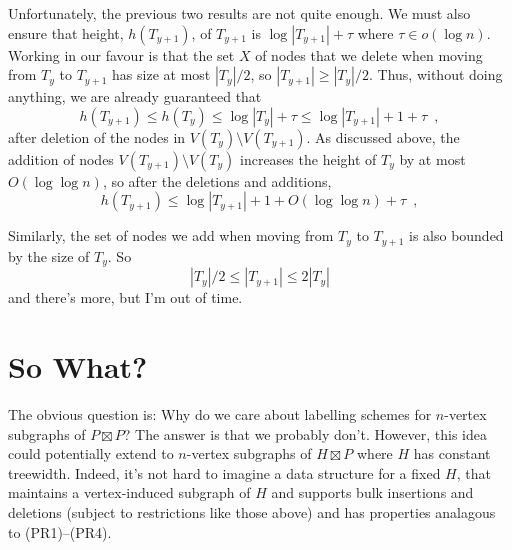\documentclass[kpfonts]{patmorin}
\begin{document}
Unfortunately, the previous two results are not quite enough.  We must also ensure that height, $h(T_{y+1})$, of $T_{y+1}$ is $\log |T_{y+1}| + \tau$ where $\tau\in o(\log n)$.  Working in our favour is that the set $X$ of nodes that we delete when moving from $T_y$ to $T_{y+1}$ has size at most $|T_y|/2$, so $|T_{y+1}|\ge |T_y|/2$. Thus, without doing anything, we are already guaranteed that 
\[  
  h(T_{y+1})\le h(T_y)\le \log|T_y|+\tau \le \log|T_{y+1}| + 1 + \tau \enspace ,
\]
after deletion of the nodes in $V(T_y)\setminus V(T_{y+1})$. As discussed above, the addition of nodes $V(T_{y+1})\setminus V(T_y)$ increases the height of $T_y$ by at most $O(\log\log n)$, so after the deletions and additions, 
\[  
  h(T_{y+1})\le \log|T_{y+1}| + 1 + O(\log\log n) + \tau \enspace ,
\]

Similarly, the set of nodes we add when moving from $T_y$ to $T_{y+1}$ is also bounded by the size of $T_y$.  So
\[ |T_y|/2\le |T_{y+1}| \le 2|T_y| \]
and there's more, but I'm out of time.


\section{So What?}

The obvious question is: Why do we care about labelling schemes for $n$-vertex subgraphs of $P\boxtimes P$? The answer is that we probably don't.  However, this idea could potentially extend to $n$-vertex subgraphs of $H\boxtimes P$ where $H$ has constant treewidth.  Indeed, it's not hard to imagine a data structure for a fixed $H$, that maintains a vertex-induced subgraph of $H$ and supports bulk insertions and deletions (subject to restrictions like those above) and has properties analagous to (PR1)--(PR4).
\end{document}
